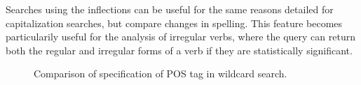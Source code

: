 \documentclass[11pt,a4paper]{article}
\begin{document}
Searches using the inflections can be useful for the same reasons detailed for capitalization searches, but compare changes in spelling. This feature becomes particularily useful for the analysis of irregular verbs, where the query can return both the regular and irregular forms of a verb if they are statistically significant.
\begin{figure}
\vspace*{-1em}
\caption{\label{fig:light} Comparison of specification of POS tag in wildcard search.}
\end{figure}
\end{document}
